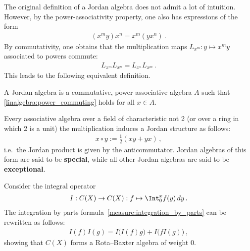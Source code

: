     The original definition of a Jordan algebra does not admit a lot of intuition. However, by the power-associativity property, one also has expressions of the form
    \begin{gather}
        (x^my)x^n = x^m(yx^n)\,.
    \end{gather}
    By commutativity, one obtains that the multiplication maps $L_{x^m}:y\mapsto x^my$ associated to powers commute:
    \begin{gather}
        \label{linalgebra:power_commuting}
        L_{x^m}L_{x^n} = L_{x^n}L_{x^m}\,.
    \end{gather}
    This leads to the following equivalent definition.
    \begin{adefinition}
        A Jordan algebra is a commutative, power-associative algebra $A$ such that \cref{linalgebra:power_commuting} holds for all $x\in A$.
    \end{adefinition}

    \begin{property}
        Every associative algebra over a field of characteristic not 2 (or over a ring in which 2 is a unit) the multiplication induces a Jordan structure as follows:
        \begin{gather}
            x\circ y := \frac{1}{2}(xy+yx)\,,
        \end{gather}
        i.e.~the Jordan product is given by the anticommutator. Jordan algebras of this form are said to be \textbf{special}, while all other Jordan algebras are said to be \textbf{exceptional}.
    \end{property}

    \begin{example}
        Consider the integral operator
        \begin{gather}
            I:C(X)\rightarrow C(X):f\mapsto\Int_0^xf(y)\,dy\,.
        \end{gather}
        The integration by parts formula~\ref{measure:integration_by_parts} can be rewritten as follows:
        \begin{gather}
            I(f)I(g) = I\bigl(I(f)g\bigr) + I\bigl(fI(g)\bigr)\,,
        \end{gather}
        showing that $C(X)$ forms a Rota--Baxter algebra of weight 0.
    \end{example}


